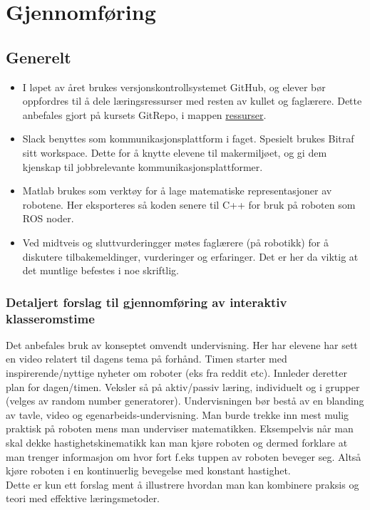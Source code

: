 \section{Gjennomføring} \label{Sec: Gjennom}



\subsection{Generelt}

    \begin{itemize}
        \item I løpet av året brukes versjonskontrollsystemet GitHub, og elever bør oppfordres til å dele læringsressurser med resten av kullet og faglærere. Dette anbefales gjort på kursets GitRepo, i mappen \href{https://github.com/KvalheimRacing/KubenRobotics/tree/master/Resources}{ressurser}.
        \item Slack benyttes som kommunikasjonsplattform i faget. Spesielt brukes Bitraf sitt workspace. Dette for å knytte elevene til makermiljøet, og gi dem kjenskap til jobbrelevante kommunikasjonsplattformer.
        \item Matlab brukes som verktøy for å lage matematiske representasjoner av robotene. Her eksporteres så koden senere til C++ for bruk på roboten som ROS noder.
        \item Ved midtveis og sluttvurderingger møtes faglærere (på robotikk) for å diskutere tilbakemeldinger, vurderinger og erfaringer. Det er her da viktig at det muntlige befestes i noe skriftlig.
    \end{itemize}

    \subsubsection*{Detaljert forslag til gjennomføring av interaktiv klasseromstime}

        Det anbefales bruk av konseptet omvendt undervisning. Her har elevene har sett en video relatert til dagens tema på forhånd. Timen starter med inspirerende/nyttige nyheter om roboter (eks fra reddit etc).
        Innleder deretter plan for dagen/timen. Veksler så på aktiv/passiv læring, individuelt og i grupper (velges av random number generatorer). Undervisningen bør bestå av en blanding av tavle, video og egenarbeids-undervisning. Man burde trekke inn mest mulig praktisk på roboten mens man underviser matematikken. Eksempelvis når man skal dekke hastighetskinematikk kan man kjøre roboten og dermed forklare at man trenger informasjon om hvor fort f.eks tuppen av roboten beveger seg. Altså kjøre roboten i en kontinuerlig bevegelse med konstant hastighet.\\
        Dette er kun ett forslag ment å illustrere hvordan man kan kombinere praksis og teori med effektive læringsmetoder.



